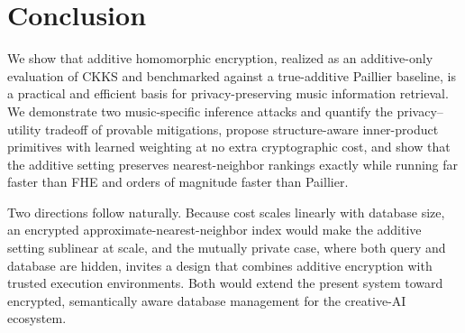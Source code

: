 \documentclass[sigconf,nonacm]{acmart}
\begin{document}
\section{Conclusion}
We show that additive homomorphic encryption, realized as an additive-only evaluation of CKKS and benchmarked against a true-additive Paillier baseline, is a practical and efficient basis for privacy-preserving music information retrieval. We demonstrate two music-specific inference attacks and quantify the privacy--utility tradeoff of provable mitigations, propose structure-aware inner-product primitives with learned weighting at no extra cryptographic cost, and show that the additive setting preserves nearest-neighbor rankings exactly while running far faster than FHE and orders of magnitude faster than Paillier.

Two directions follow naturally. Because cost scales linearly with database size, an encrypted approximate-nearest-neighbor index would make the additive setting sublinear at scale, and the mutually private case, where both query and database are hidden, invites a design that combines additive encryption with trusted execution environments. Both would extend the present system toward encrypted, semantically aware database management for the creative-AI ecosystem.



\end{document}

